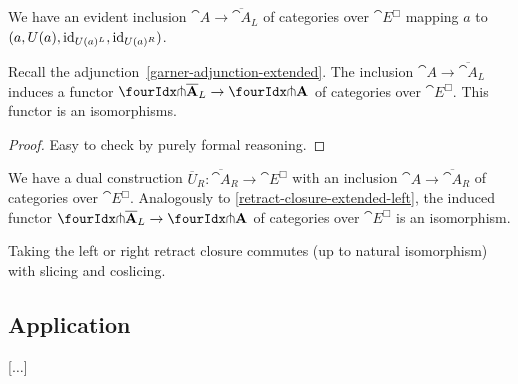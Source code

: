 \documentclass[reqno,10pt,a4paper,oneside]{amsart}
\begin{document}
We have an evident inclusion $\cat{A} \to \overline{\cat{A}}_L$ of categories over $\cat{E}^{\Box}$ mapping $a$ to $(a, U(a), \operatorname{id}_{U(a){}^L}, \operatorname{id}_{U(a){}^R})$.

\begin{lemma}
\label{retract-closure-extended-left}
Recall the adjunction~\eqref{garner-adjunction-extended}.
The inclusion $\cat{A} \to \overline{\cat{A}}_L$ induces a functor $\liftr{\overline{\cat{A}}_L} \to \liftr{\cat{A}}$ of categories over $\cat{E}^{\Box}$.
This functor is an isomorphisms.
\end{lemma}

\begin{proof}
Easy to check by purely formal reasoning.
\end{proof}

\begin{remark}
\label{retract-closure-extended-right}
We have a dual construction $\overline{U}_R : \overline{\cat{A}}_R \to \cat{E}^{\Box}$ with an inclusion $\cat{A} \to \overline{\cat{A}}_R$ of categories over $\cat{E}^{\Box}$.
Analogously to \cref{retract-closure-extended-left}, the induced functor $\liftl{\overline{\cat{A}}_L} \to{} \liftl{\cat{A}}$ of categories over $\cat{E}^{\Box}$ is an isomorphism.
\end{remark}

\begin{remark}
\label{retract-closure-extended-slicing}
Taking the left or right retract closure commutes (up to natural isomorphism) with slicing and coslicing.
\end{remark}

\subsection{Application}

[$\ldots$]




\end{document}
